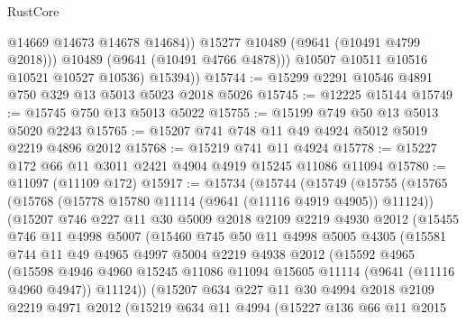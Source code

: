 \begin{lexlean}{RustCore}
\begin{coremodule}
                  @14669
                  @14673
                  @14678
                  @14684))
              @15277
              @10489
              (@9641 (@10491 @4799 @2018)))
            @10489
            (@9641 (@10491 @4766 @4878)))
          @10507
          @10511
          @10516
          @10521
          @10527
          @10536)
        @15394))
@15744 := @15299 @2291 @10546 @4891 @750 @329 @13 @5013 @5023 @2018 @5026
@15745 := @12225 @15144
@15749 := @15745 @750 @13 @5013 @5022
@15755 := @15199 @749 @50 @13 @5013 @5020 @2243
@15765 := @15207 @741 @748 @11 @49 @4924 @5012 @5019 @2219 @4896 @2012
@15768 := @15219 @741 @11 @4924
@15778 := @15227 @172 @66 @11 @3011 @2421 @4904 @4919 @15245 @11086 @11094
@15780 := @11097 (@11109 @172)
@15917 := @15734
    (@15744
      (@15749
        (@15755
          (@15765
            (@15768 (@15778 @15780 @11114 (@9641 (@11116 @4919 @4905)) @11124))
            (@15207
              @746
              @227
              @11
              @30
              @5009
              @2018
              @2109
              @2219
              @4930
              @2012
              (@15455
                @746
                @11
                @4998
                @5007
                (@15460
                  @745
                  @50
                  @11
                  @4998
                  @5005
                  @4305
                  (@15581
                    @744
                    @11
                    @49
                    @4965
                    @4997
                    @5004
                    @2219
                    @4938
                    @2012
                    (@15592
                      @4965
                      (@15598
                        @4946
                        @4960
                        @15245
                        @11086
                        @11094
                        @15605
                        @11114
                        (@9641 (@11116 @4960 @4947))
                        @11124))
                    (@15207
                      @634
                      @227
                      @11
                      @30
                      @4994
                      @2018
                      @2109
                      @2219
                      @4971
                      @2012
                      (@15219
                        @634
                        @11
                        @4994
                        (@15227
                          @136
                          @66
                          @11
                          @2015

\end{coremodule}
\end{lexlean}
